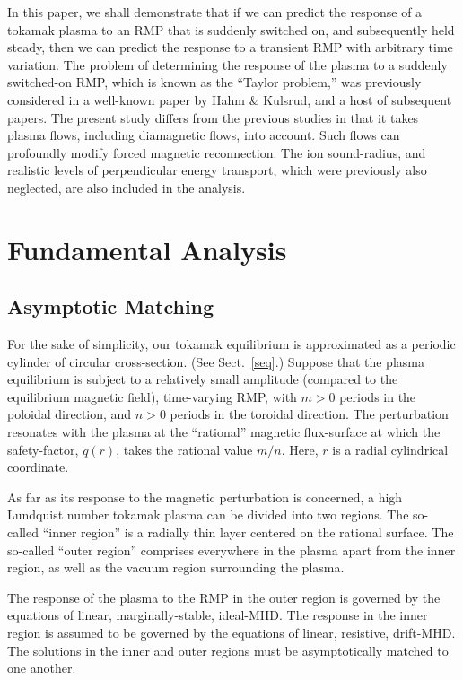 \documentclass[12pt,prb,aps]{revtex4-1}
\begin{document}
In this paper, we shall demonstrate that if we can predict the response of a tokamak plasma to an RMP that is suddenly switched on, and
subsequently held steady, then we  can predict the response to a transient RMP with arbitrary time variation. The problem of determining  the
response of the plasma  to a suddenly switched-on RMP, which is known as the ``Taylor problem,''  was  previously considered in a well-known paper by
Hahm \& Kulsrud,\cite{hk} and a host of subsequent papers.\cite{wb,rf1,rfb,rfc,rf2,rfd,com,hz} The present study differs from the previous studies in that it takes
plasma flows, including diamagnetic flows, into account. Such flows can profoundly modify forced magnetic reconnection. 
The ion sound-radius, and realistic levels of perpendicular energy  transport, which were previously also neglected,  are also included in the analysis. 

\section{Fundamental Analysis}

\subsection{Asymptotic Matching}
For the sake of simplicity, our tokamak equilibrium is approximated as a periodic cylinder of circular cross-section. (See Sect.~\ref{seq}.)
Suppose that the plasma equilibrium is subject to a relatively small amplitude (compared to  the equilibrium magnetic field), time-varying RMP, with $m>0$ periods in the poloidal direction, and $n>0$ periods in the
toroidal direction. The perturbation resonates with the plasma at the ``rational'' magnetic flux-surface at which the safety-factor, $q(r)$, 
takes the rational value $m/n$.\cite{err1,ric3}  Here, $r$ is a radial cylindrical coordinate. 

As far as its response to the magnetic perturbation is concerned, a high Lundquist number
tokamak plasma can be divided into two regions.\cite{fkr,hk,wb,err1,err1a,rf1,rf2,err2,com,hz,err3}
 The so-called ``inner region'' is a radially thin layer centered on the rational surface. The so-called ``outer region'' comprises everywhere in the plasma apart from the
inner region, as well as the vacuum region surrounding the plasma. 

The response of the plasma to the RMP in the outer region is
governed by the equations of linear, marginally-stable, ideal-MHD.\cite{err1} The response in the inner region is assumed to be governed by the equations of linear,
 resistive, drift-MHD.\cite{ric3} The solutions in the inner and outer regions must be asymptotically 
matched to one another.\cite{fkr}
\end{document}
